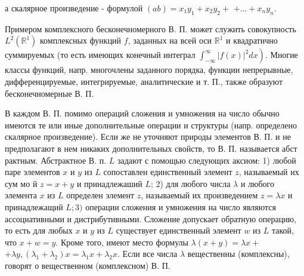 \documentclass[10pt]{article}
\begin{document}
а скалярное произведение - формулой $(a b)=x_{1} y_{1}+x_{2} y_{2}+$ $+\ldots+x_{n} y_{n}$.



Примером комплексного бесконечномерного В. П. может служить совокупность $L^{2}\left(\mathbb{R}^{1}\right)$ комплексных функций $f$, заданных на всей оси $\mathbb{R}^{1}$ и квадратично суммируемых (то есть имеющих конечный интеграл $\left.\int_{-\infty}^{\infty}|f(x)|^{2} d x\right)$. Многие классы функций, напр. многочлены заданного порядка, функции непрерывные, дифференцируемые, интегрируемые, аналитические и т. П., также образуют бесконечномерные В. П.



В каждом В. П. помимо операций сложения и умножения на число обычно имеются те или иные дополнительные операции и структуры (напр. определено скалярное произведение). Если же не уточняют природы элементов В. П. и не предполагают в нем никаких дополнительных свойств, то В. П. называется абст рактным. Абстрактное В. п. $L$ задают с помощью следующих аксиом: 1) любой паре элементов $x$ и $y$ из $L$ сопоставлен единственный элемент $z$, называемый их сум мо й $z=x+y$ и принадлежаший $L$; 2) для любого числа $\lambda$ и любого элемента $x$ из $L$ определен элемент $z$, называемый их произведением $z=\lambda x$ и принадлежащий $L ; 3)$ операции сложения и умножения на число являются ассоциативными и дистрибутивными. Сложение допускает обратную операцию, то есть для любых $x$ и $y$ из $L$ существует единственный элемент $w$ из $L$ такой, что $x+w=y$. Кроме того, имеют место формулы $\lambda(x+y)=\lambda x+$ $+\lambda y,\left(\lambda_{1}+\lambda_{2}\right) x=\lambda_{1} x+\lambda_{2} x$. Если все числа $\lambda$ вещественны (комплексны), говорят о вещественном (комплексном) В. П.
\end{document}
